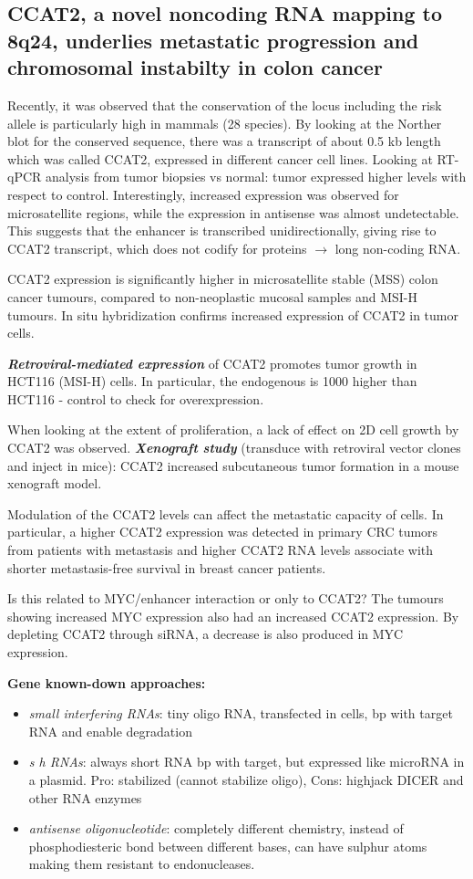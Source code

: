 \subsection{CCAT2, a novel noncoding RNA mapping to 8q24, underlies metastatic progression and chromosomal instabilty in colon cancer}

Recently, it was observed that the conservation of the locus including the risk allele is particularly high in mammals (28 species). By looking at the Norther blot for the conserved sequence, there was a transcript of about 0.5 kb length which was called CCAT2, expressed in different cancer cell lines. Looking at RT-qPCR analysis from tumor biopsies vs normal: tumor expressed higher levels with respect to control. Interestingly, increased expression was observed for microsatellite regions, while the expression in antisense was almost undetectable. This suggests that the enhancer is transcribed unidirectionally, giving rise to CCAT2 transcript, which does not codify for proteins $\rightarrow$ long non-coding RNA.

CCAT2 expression is significantly higher in microsatellite stable (MSS) colon cancer tumours, compared to non-neoplastic mucosal samples and MSI-H tumours. In situ hybridization confirms increased expression of CCAT2 in tumor cells.

\textbf{\emph{Retroviral-mediated expression}} of CCAT2 promotes tumor growth in HCT116 (MSI-H) cells. In particular, the endogenous is 1000 higher than HCT116 - control to check for overexpression.

When looking at the extent of proliferation, a lack of effect on 2D cell growth by CCAT2 was observed. \textbf{\emph{Xenograft study}} (transduce with retroviral vector clones and inject in mice): CCAT2 increased subcutaneous tumor formation in a mouse xenograft model.

Modulation of the CCAT2 levels can affect the metastatic capacity of cells. In particular, a higher CCAT2 expression was detected in primary CRC tumors from patients with metastasis and higher CCAT2 RNA levels associate with shorter metastasis-free survival in breast cancer patients.

Is this related to MYC/enhancer interaction or only to CCAT2? The tumours showing increased MYC expression also had an increased CCAT2 expression. By depleting CCAT2 through siRNA, a decrease is also produced in MYC expression.

\textbf{Gene known-down approaches:}

\begin{itemize}
\tightlist
\item
  \emph{small interfering RNAs}: tiny oligo RNA, transfected in cells, bp with target RNA and enable degradation
\item
  \emph{s h RNAs}: always short RNA bp with target, but expressed like microRNA in a plasmid. Pro: stabilized (cannot stabilize oligo), Cons: highjack DICER and other RNA enzymes
\item
  \emph{antisense oligonucleotide}: completely different chemistry, instead of phosphodiesteric bond between different bases, can have sulphur atoms making them resistant to endonucleases.
\end{itemize}

